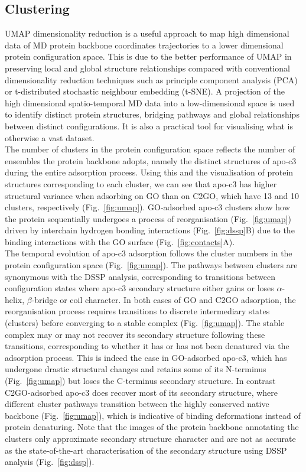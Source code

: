 \subsection{Clustering}
UMAP dimensionality reduction is a useful approach to map high dimensional data of MD protein backbone coordinates trajectories to a lower dimensional protein configuration space.\cite{mcinnes2018umap-software} This is due to the better performance of UMAP in preserving local and global structure relationships compared with conventional dimensionality reduction techniques such as principle component analysis (PCA) or t-distributed stochastic neighbour embedding (t-SNE). A projection of the high dimensional spatio-temporal MD data into a low-dimensional space is used to identify distinct protein structures, bridging pathways and global relationships between distinct configurations. It is also a practical tool for visualising what is otherwise a vast dataset. \\

The number of clusters in the protein configuration space reflects the number of ensembles the protein backbone adopts, namely the distinct structures of apo-c3 during the entire adsorption process. Using this and the visualisation of protein structures corresponding to each cluster, we can see that apo-c3 has higher structural variance when adsorbing on GO than on C2GO, which have 13 and 10 clusters, respectively (Fig.~\ref{fig:umap}). GO-adsorbed apo-c3 clusters show how the protein sequentially undergoes a process of reorganisation (Fig.~\ref{fig:umap}) driven by interchain hydrogen bonding interactions (Fig.~\ref{fig:dssp}B) due to the binding interactions with the GO surface (Fig.~\ref{fig:contacts}A). \\

The temporal evolution of apo-c3 adsorption follows the cluster numbers in the protein configuration space (Fig.~\ref{fig:umap}). The pathways between clusters are synonymous with the DSSP analysis, corresponding to transitions between configuration states where apo-c3 secondary structure either gains or loses $\alpha$-helix, $\beta$-bridge or coil character. In both cases of GO and C2GO adsorption, the reorganisation process requires transitions to discrete intermediary states (clusters) before converging to a stable complex (Fig.~\ref{fig:umap}). The stable complex may or may not recover its secondary structure following these transitions, corresponding to whether it has or has not been denatured via the adsorption process. This is indeed the case in GO-adsorbed apo-c3, which has undergone drastic structural changes and retains some of its N-terminus (Fig.~\ref{fig:umap}) but loses the C-terminus secondary structure. In contrast C2GO-adsorbed apo-c3 does recover most of its secondary structure, where different cluster pathways transition between the highly conserved native backbone (Fig.~\ref{fig:umap}), which is indicative of binding deformations instead of protein denaturing. Note that the images of the protein backbone annotating the clusters only approximate secondary structure character and are not as accurate as the state-of-the-art characterisation of the secondary structure using DSSP analysis (Fig.~\ref{fig:dssp}). 

